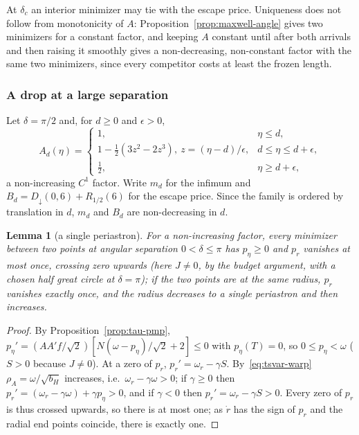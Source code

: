 \documentclass[aip,jmp,amsmath,amssymb,reprint]{revtex4-2}
\theoremstyle{plain}
\newtheorem{lemma}[proposition]{Lemma}
\theoremstyle{definition}
\begin{document}
At $\delta_c$ an interior minimizer may tie with the escape price. Uniqueness does not follow from
monotonicity of $A$: Proposition~\ref{prop:maxwell-angle} gives two minimizers for a constant
factor, and keeping $A$ constant until after both arrivals and then raising it smoothly gives a
non-decreasing, non-constant factor with the same two minimizers, since every competitor costs at
least the frozen length.

\subsubsection*{A drop at a large separation}
Let $\delta=\pi/2$ and, for $d\ge0$ and $\epsilon>0$,
\[
  A_{d}(\eta)=\begin{cases}1,&\eta\le d,\\ 1-\frac12(3z^2-2z^3),\ z=(\eta-d)/\epsilon,&d\le\eta\le d+\epsilon,\\
  \frac12,&\eta\ge d+\epsilon,\end{cases}
\]
a non-increasing $C^1$ factor. Write $m_d$ for the infimum and $B_d=D_\downarrow(0,6)+R_{1/2}(6)$ for the escape
price. Since the family is ordered by translation in $d$, $m_d$ and $B_d$ are non-decreasing in $d$.

\begin{lemma}[a single periastron]\label{lem:tau-var-peri}
For a non-increasing factor, every minimizer between two points at angular separation $0<\delta\le\pi$ has $p_\eta\ge0$ and $p_r$ vanishes at
most once, crossing zero upwards (here $J\neq0$, by the budget argument, with a chosen half great circle at
$\delta=\pi$); if the two points are at the same radius, $p_r$ vanishes exactly once, and the radius decreases to a single periastron and then increases.
\end{lemma}

\begin{proof}
By Proposition~\ref{prop:tau-pmp}, $p_\eta'=(AA'f/\sqrt2)[N(\omega-p_\eta)/\sqrt2+2]\le0$ with $p_\eta(T)=0$, so $0\le p_\eta<\omega$
($S>0$ because $J\neq0$). At a zero of $p_r$, $p_r'=\omega_r-\gamma S$. By~\eqref{eq:tsvar-warp}
$\rho_A=\omega/\sqrt{b_H}$ increases, i.e.\ $\omega_r-\gamma\omega>0$; if $\gamma\ge0$ then
$p_r'=(\omega_r-\gamma\omega)+\gamma p_\eta>0$, and if $\gamma<0$ then $p_r'=\omega_r-\gamma S>0$. Every zero of $p_r$ is thus
crossed upwards, so there is at most one; as $\dot r$ has the sign of $p_r$ and the radial end points
coincide, there is exactly one.
\end{proof}
\end{document}
